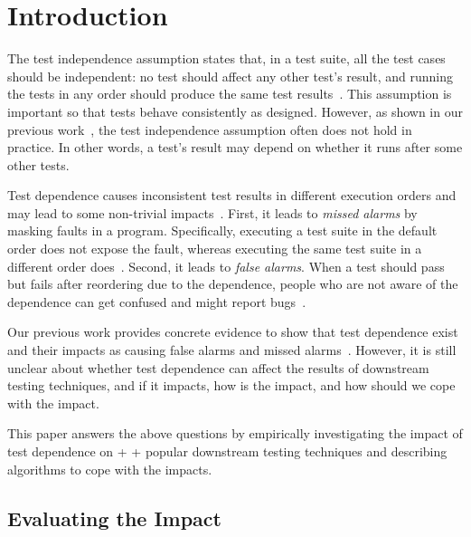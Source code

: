 \section{Introduction}


The test independence assumption states
that, in a test suite, all the test cases should be independent:
no test should affect any other test's result, and running
the tests in any order should produce the same test
results~\cite{testdependence}.
This assumption is important so that
tests behave consistently as designed. However,
as shown in our previous work~\cite{testdependence}, the test
independence assumption often does not hold in practice.
In other words, a test's result may depend on whether it runs after
some other tests.


Test dependence causes inconsistent test results in different
execution orders and may lead to
some non-trivial impacts~\cite{testdependence}. First,
it leads to \textit{missed alarms} by masking faults in a program.
Specifically, executing a test suite in the default order does not
expose the fault, whereas executing the same test suite in
a different order does~\cite{clibug}. Second, 
it leads to \textit{false alarms}.
When a test should pass but fails after reordering due to
the dependence, people who are not aware of the dependence
can get confused and might report bugs~\cite{eclipsebug}. 



Our previous work provides concrete evidence to
show that test dependence exist and their impacts as causing
false alarms and missed alarms~\cite{testdependence}.
However, it is still unclear about whether test dependence can affect the
results of downstream testing techniques, and if it
impacts, how is the impact, and how should we cope with the impact.

This paper answers the above questions by empirically
investigating the impact of test dependence on
\prionum + \selnum + \parnum popular downstream testing techniques
and describing algorithms to cope with the impacts.

\subsection{Evaluating the Impact}


